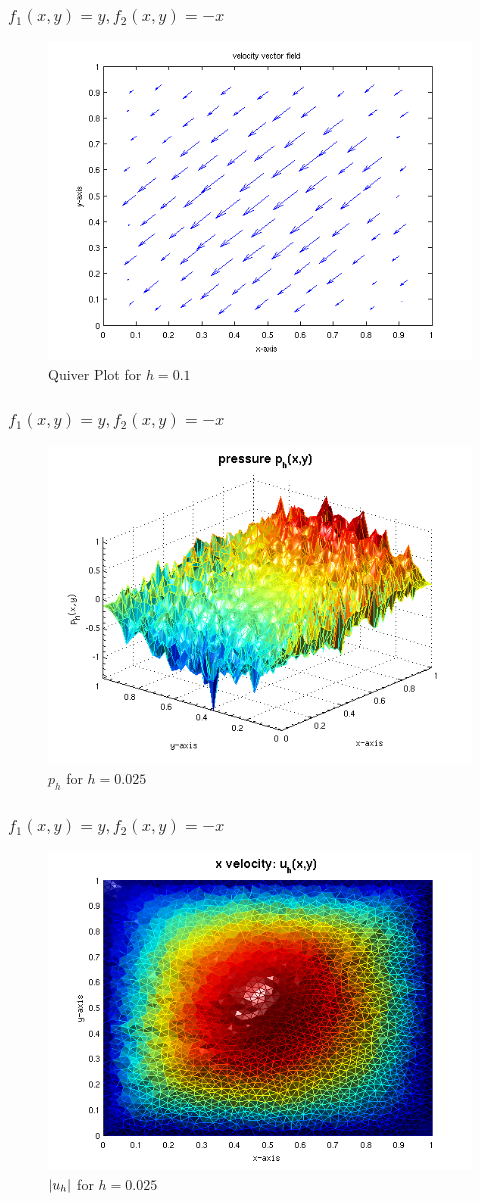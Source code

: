 \documentclass{beamer}
\begin{document}
\begin{frame}
    \frametitle{$f_1(x,y) = y, f_2(x,y) = -x$}
\begin{figure}
\includegraphics[width=0.5\linewidth]{./q1.png}
\caption{Quiver Plot for $h=0.1$}
\end{figure}
\end{frame}


\begin{frame}
    \frametitle{$f_1(x,y) = y, f_2(x,y) = -x$}
\begin{figure}
\includegraphics[width=0.5\linewidth]{./p2.png}
\caption{$p_h$ for $h=0.025$}
\end{figure}
\end{frame}

\begin{frame}
    \frametitle{$f_1(x,y) = y, f_2(x,y) = -x$}
\begin{figure}
\includegraphics[width=0.5\linewidth]{./magu_2.png}
\caption{$\left|u_h\right|$ for $h=0.025$}
\end{figure}
\end{frame}
\end{document}

